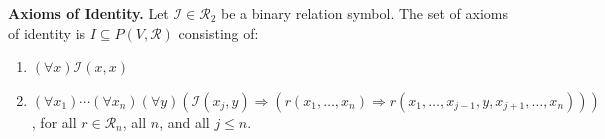 \textbf{Axioms of Identity.} Let $\mathcal{I} \in \mathcal{R}_2$ be a binary relation symbol. The set of axioms of identity is $I \subseteq P(V, \mathcal{R})$ consisting of:

\begin{enumerate}
  \item $(\forall x) \mathcal{I}(x, x)$
  \item $(\forall x_1) \cdots (\forall x_n) (\forall y) (\mathcal{I}(x_j, y) \Rightarrow (r(x_1, \ldots, x_n) \Rightarrow r(x_1, \ldots, x_{j-1}, y, x_{j+1}, \ldots, x_n)))$,
  for all $r \in \mathcal{R}_n$, all $n$, and all $j \leq n$.
\end{enumerate}
